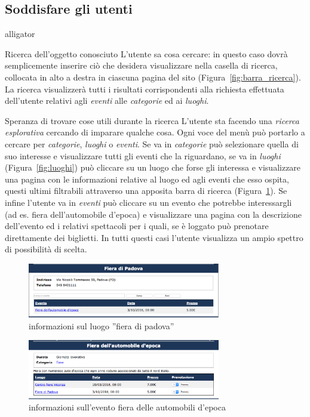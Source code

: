 \documentclass[10pt, a4paper]{article}
\begin{document}
\subsection{Soddisfare gli utenti}
\begin{labeling}{alligator}
  \item[Ricerca dell'oggetto conosciuto] L'utente sa cosa cercare: in questo caso dovrà semplicemente inserire ciò che desidera visualizzare nella casella di ricerca,
  collocata in alto a destra in ciascuna pagina del sito (Figura~\ref{fig:barra_ricerca}). La ricerca visualizzerà tutti i risultati corrispondenti alla richiesta effettuata dell'utente relativi agli \emph{eventi} alle \emph{categorie} ed ai \emph{luoghi}. 
  \item[Speranza di trovare cose utili durante la ricerca]
    L’utente  sta facendo una \emph{ricerca esplorativa} cercando di imparare qualche cosa.
    Ogni voce del menù può portarlo a cercare per \emph{categorie}, \emph{luoghi} o 
    \emph{eventi}.
    Se va in \emph{categorie} può selezionare quella di suo interesse e visualizzare tutti
    gli eventi che la riguardano, se va in \emph{luoghi} (Figura~\ref{fig:luoghi}) può
    cliccare su un luogo che forse gli interessa e visualizzare una pagina con le informazioni
    relative al luogo ed agli eventi che esso ospita, questi ultimi filtrabili attraverso una
    apposita barra di ricerca (Figura~\ref{fig:info_luogo}). Se infine l'utente va in
    \emph{eventi} può cliccare su un evento che potrebbe interessargli 
    (ad es. fiera dell'automobile d'epoca) e visualizzare una
    pagina con la descrizione dell'evento ed i relativi spettacoli per i quali, se è 
    loggato può prenotare direttamente dei biglietti. In tutti questi casi l'utente visualizza un ampio spettro di possibilità di scelta.

    \begin{figure}[h!]
      \centering
      \includegraphics[width=0.75\textwidth]{Images/info_luogo.png}
      \caption{informazioni sul luogo ''fiera di padova''}
      \label{fig:info_luogo}
    \end{figure}

    \begin{figure}[h!]
      \centering
      \includegraphics[width=0.75\textwidth]{Images/info_evento.png}
      \caption{informazioni sull'evento fiera delle automobili d'epoca}
      \label{fig:info_evento}
    \end{figure}


\end{labeling}
\end{document}
